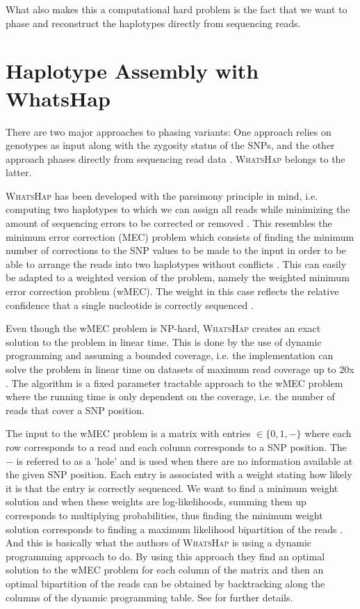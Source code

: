 \documentclass[10pt,a4paper]{article}
\begin{document}
What also makes this a computational hard problem is the fact that we want to phase and reconstruct the haplotypes directly from sequencing reads. 

\section{Haplotype Assembly with WhatsHap}
There are two major approaches to phasing variants: One approach relies on genotypes as input along with the zygosity status of the SNPs, and the other approach phases directly from sequencing read data \cite{whatshap}. \textsc{WhatsHap} belongs to the latter. 

\textsc{WhatsHap} has been developed with the parsimony principle in mind, i.e. computing two haplotypes to which we can assign all reads while minimizing the amount of sequencing errors to be corrected or removed \cite{whatshap}. This resembles the minimum error correction (MEC) problem which consists of finding the minimum number of corrections to the SNP values to be made to the input in order to be able to arrange the reads into two haplotypes without conflicts \cite{whatshap}. This can easily be adapted to a weighted version of the problem, namely the weighted minimum error correction problem (wMEC). The weight in this case reflects the relative confidence that a single nucleotide is correctly sequenced \cite{whatshap}.

Even though the wMEC problem is NP-hard, \textsc{WhatsHap} creates an exact solution to the problem in linear time. This is done by the use of dynamic programming and assuming a bounded coverage, i.e. the implementation can solve the problem in linear time on datasets of maximum read coverage up to 20x \cite{whatshap}. The algorithm is a fixed parameter tractable approach to the wMEC problem where the running time is only dependent on the coverage, i.e. the number of reads that cover a SNP position.

The input to the wMEC problem is a matrix with entries $\in\{0, 1, -\}$ where each row corresponds to a read and each column corresponds to a SNP position. The $-$ is referred to as a 'hole' and is used when there are no information available at the given SNP position. Each entry is associated with a weight stating how likely it is that the entry is correctly sequenced. We want to find a minimum weight solution and when these weights are log-likelihoods, summing them up corresponds to multiplying probabilities, thus finding the minimum weight solution corresponds to finding a maximum likelihood bipartition of the reads \cite{whatshap}. And this is basically what the authors of \textsc{WhatsHap} is using a dynamic programming approach to do. By using this approach they find an optimal solution to the wMEC problem for each column of the matrix and then an optimal bipartition of the reads can be obtained by backtracking along the columns of the dynamic programming table. See \cite{whatshap} for further details.
\end{document}
